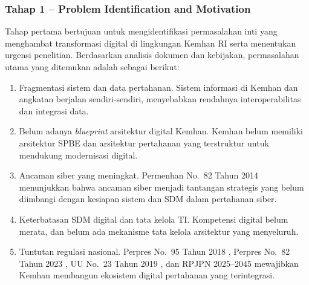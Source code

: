 \subsubsection{Tahap 1 – Problem Identification and Motivation}
Tahap pertama bertujuan untuk mengidentifikasi permasalahan inti yang menghambat transformasi digital di lingkungan Kemhan RI serta menentukan urgensi penelitian.
Berdasarkan analisis dokumen dan kebijakan, permasalahan utama yang ditemukan adalah sebagai berikut:
\begin{enumerate}
  \item Fragmentasi sistem dan data pertahanan.
  Sistem informasi di Kemhan dan angkatan berjalan sendiri-sendiri, menyebabkan rendahnya interoperabilitas dan integrasi data.
  \item Belum adanya \textit{blueprint} arsitektur digital Kemhan.
  Kemhan belum memiliki arsitektur SPBE dan arsitektur pertahanan yang terstruktur untuk mendukung modernisasi digital.
  \item Ancaman siber yang meningkat.
  Permenhan No.~82 Tahun 2014 \parencite{KemhanRI2014} menunjukkan bahwa ancaman siber menjadi tantangan strategis yang belum diimbangi dengan kesiapan sistem dan SDM dalam pertahanan siber.
  \item Keterbatasan SDM digital dan tata kelola TI.
  Kompetensi digital belum merata, dan belum ada mekanisme tata kelola arsitektur yang menyeluruh.
  \item Tuntutan regulasi nasional.
  Perpres No.~95 Tahun 2018 \parencite{KementerianKomunikasidanInformatika2018}, Perpres No.~82 Tahun 2023 \parencite{RepublikIndonesia2023}, UU No.~23 Tahun 2019 \parencite{RI2019}, dan RPJPN 2025--2045 \parencite{RPJPN2025} mewajibkan Kemhan membangun ekosistem digital pertahanan yang terintegrasi.
\end{enumerate}

